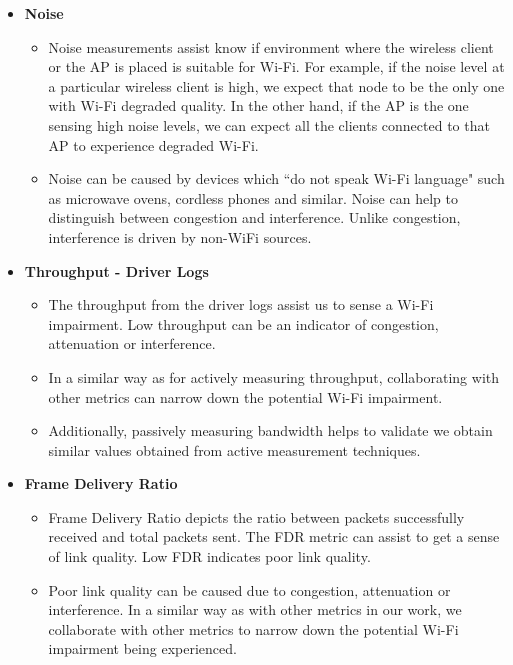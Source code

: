 \begin{itemize}
	\item \textbf{Noise}
	\begin{itemize}
		\item  Noise measurements assist know if environment where the wireless client or the AP is placed is suitable for Wi-Fi. For example, if the noise level at a particular wireless client is high, we expect that node to be the only one with Wi-Fi degraded quality. In the other hand, if the AP is the one sensing high noise levels, we can expect all the clients connected to that AP to experience degraded Wi-Fi.
		\item Noise can be caused by devices which ``do not speak Wi-Fi language" such as microwave ovens, cordless phones and similar. Noise can help to distinguish between congestion and interference. Unlike congestion, interference is driven by non-WiFi sources.
	\end{itemize}
	
	\item \textbf{Throughput - Driver Logs}
	\begin{itemize}
		\item The throughput from the driver logs assist us to sense a Wi-Fi impairment. Low throughput can be an indicator of congestion, attenuation or interference.
		\item In a similar way as for actively measuring throughput,  collaborating with other metrics can narrow down the potential Wi-Fi impairment.
		\item Additionally, passively measuring bandwidth helps to validate we obtain similar values obtained from active measurement techniques.
	\end{itemize}
	\newpage
	\item \textbf{Frame Delivery Ratio}
	\begin{itemize}
		\item Frame Delivery Ratio depicts the ratio between packets successfully received and total packets sent. The FDR metric can assist to get a sense of link quality. Low FDR indicates poor link quality. 
		\item Poor link quality can be caused due to congestion, attenuation or interference. In a similar way as with other metrics in our work, we collaborate with other metrics to narrow down the potential Wi-Fi impairment being experienced.
	\end{itemize}

\end{itemize}

